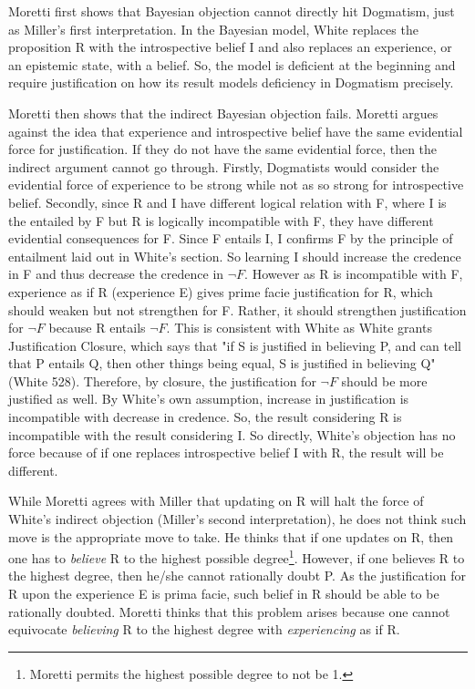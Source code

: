 Moretti first shows that Bayesian objection cannot directly hit
Dogmatism, just as Miller's first interpretation. In the Bayesian model,
White replaces the proposition R with the introspective belief I and
also replaces an experience, or an epistemic state, with a belief. So,
the model is deficient at the beginning and require justification on how
its result models deficiency in Dogmatism precisely.

Moretti then shows that the indirect Bayesian objection fails. Moretti
argues against the idea that experience and introspective belief have
the same evidential force for justification. If they do not have the
same evidential force, then the indirect argument cannot go through.
Firstly, Dogmatists would consider the evidential force of experience to
be strong while not as so strong for introspective belief. Secondly,
since R and I have different logical relation with F, where I is the
entailed by F but R is logically incompatible with F, they have
different evidential consequences for F. Since F entails I, I confirms F
by the principle of entailment laid out in White's section. So learning
I should increase the credence in F and thus decrease the credence in
$\neg F$. However as R is incompatible with F, experience as
if R (experience E) gives prime facie justification for R, which should
weaken but not strengthen for F. Rather, it should strengthen
justification for $\neg F$ because R entails
$\neg F$. This is consistent with White as White grants
Justification Closure, which says that "if S is justified in believing
P, and can tell that P entails Q, then other things being equal, S is
justified in believing Q" (White 528). Therefore, by closure, the
justification for $\neg F$ should be more justified as well.
By White's own assumption, increase in justification is incompatible
with decrease in credence. So, the result considering R is incompatible
with the result considering I. So directly, White's objection has no
force because of if one replaces introspective belief I with R, the
result will be different.

While Moretti agrees with Miller that updating on R will halt the force
of White's indirect objection (Miller's second interpretation), he does
not think such move is the appropriate move to take. He thinks that if
one updates on R, then one has to \emph{believe} R to the highest
possible degree\footnote{Moretti permits the highest possible degree to
  not be 1.}. However, if one believes R to the highest degree, then
he/she cannot rationally doubt P. As the justification for R upon the
experience E is prima facie, such belief in R should be able to be
rationally doubted. Moretti thinks that this problem arises because one
cannot equivocate \emph{believing} R to the highest degree with
\emph{experiencing} as if R.

